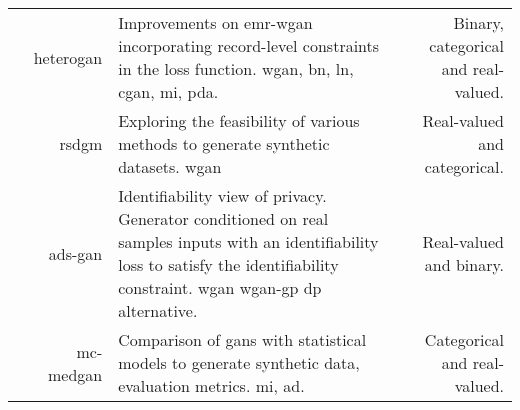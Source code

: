 \begin{center}
\begin{longtable}[l]{@{}p{}NMR@{}}
        \citeauthor{yan2020generating} & \gls{heterogan}
        & Improvements on \gls{emr-wgan} incorporating record-level constraints in the loss function.   \gls{wgan}, \gls{bn}, \gls{ln}, \gls{cgan}, \gls{mi}, \gls{pda}.
        & Binary, categorical and real-valued.\\
        
        \citeauthor{ozyigit2020generation} & \gls{rsdgm}
        & Exploring the feasibility of various methods to generate synthetic datasets.   \gls{wgan}
        & Real-valued and categorical.\\
        
        \citeauthor{Yoon2020-anon} & \gls{ads-gan}
        & Identifiability view of privacy. Generator conditioned on real samples inputs with an identifiability loss to satisfy the identifiability constraint.   \gls{wgan} \gls{wgan-gp} \gls{dp} alternative.
        & Real-valued and binary.\\
        
        \citeauthor{Goncalves2020} & \gls{mc-medgan}
        & Comparison of \glspl{gan} with statistical models to generate synthetic data, evaluation metrics.   \gls{mi}, \gls{ad}.
        & Categorical and real-valued.\\
           
        \hline
        
    \end{longtable}
\end{center}